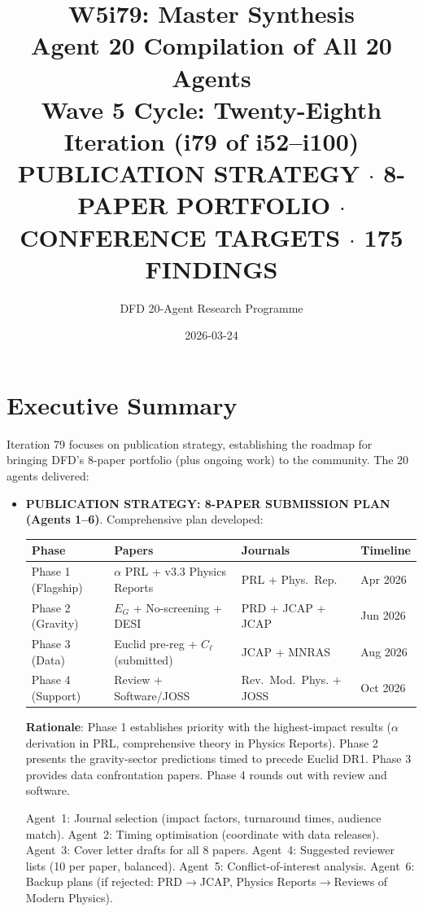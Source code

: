 \documentclass[11pt,a4paper]{article}
\title{\Huge W5i79: Master Synthesis\\[12pt]
\Large Agent 20 Compilation of All 20 Agents\\[6pt]
\large Wave 5 Cycle: Twenty-Eighth Iteration (i79 of i52--i100)\\[6pt]
\normalsize \textbf{PUBLICATION STRATEGY} $\cdot$ 8-PAPER PORTFOLIO $\cdot$ CONFERENCE TARGETS $\cdot$ 175 FINDINGS}
\author{DFD 20-Agent Research Programme}
\date{2026-03-24}
\begin{document}
\maketitle

\section{Executive Summary}

Iteration 79 focuses on publication strategy, establishing the roadmap for bringing DFD's 8-paper portfolio (plus ongoing work) to the community. The 20 agents delivered:

\begin{itemize}
\item \textbf{PUBLICATION STRATEGY: 8-PAPER SUBMISSION PLAN (Agents 1--6)}. Comprehensive plan developed:

\begin{center}
\begin{tabular}{llll}
\toprule
\textbf{Phase} & \textbf{Papers} & \textbf{Journals} & \textbf{Timeline} \\
\midrule
Phase 1 (Flagship) & $\alpha$ PRL + v3.3 Physics Reports & PRL + Phys.\ Rep. & Apr 2026 \\
Phase 2 (Gravity) & $E_G$ + No-screening + DESI & PRD + JCAP + JCAP & Jun 2026 \\
Phase 3 (Data) & Euclid pre-reg + $C_\ell$ (submitted) & JCAP + MNRAS & Aug 2026 \\
Phase 4 (Support) & Review + Software/JOSS & Rev.\ Mod.\ Phys. + JOSS & Oct 2026 \\
\bottomrule
\end{tabular}
\end{center}

\textbf{Rationale}: Phase 1 establishes priority with the highest-impact results ($\alpha$ derivation in PRL, comprehensive theory in Physics Reports). Phase 2 presents the gravity-sector predictions timed to precede Euclid DR1. Phase 3 provides data confrontation papers. Phase 4 rounds out with review and software.

Agent~1: Journal selection (impact factors, turnaround times, audience match). Agent~2: Timing optimisation (coordinate with data releases). Agent~3: Cover letter drafts for all 8 papers. Agent~4: Suggested reviewer lists (10 per paper, balanced). Agent~5: Conflict-of-interest analysis. Agent~6: Backup plans (if rejected: PRD$\to$JCAP, Physics Reports$\to$Reviews of Modern Physics).


\end{itemize}
\end{document}
